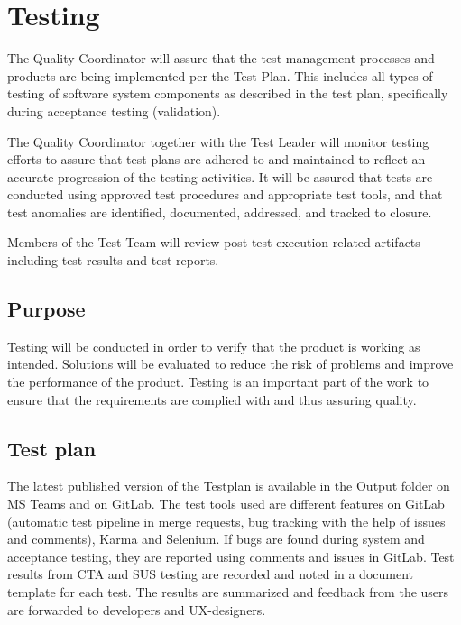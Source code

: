 \section{Testing}

The Quality Coordinator will assure that the test management processes and products are being implemented per the Test Plan. This includes all types of testing of software system components as described in the test plan, specifically during acceptance testing (validation).

The Quality Coordinator together with the Test Leader will monitor testing efforts to assure that test plans are adhered to and maintained to reflect an accurate progression of the testing activities. It will be assured that tests are conducted using approved test procedures and appropriate test tools, and that test anomalies are identified, documented, addressed, and tracked to closure.

Members of the Test Team will review post-test execution related artifacts including test results and test reports.

\subsection{Purpose}
Testing will be conducted in order to verify that the product is working as intended. Solutions will be evaluated to reduce the risk of problems and improve the performance of the product. Testing is an important part of the work to ensure that the requirements are complied with and thus assuring quality.

\subsection{Test plan}
The latest published version of the Testplan is available in the Output folder on MS Teams and on \href{https://gitlab.liu.se/tddc88-company-1-2021/deploy/-/tree/develop/documents/Test\%20Plan}{GitLab}. The test tools used are different features on GitLab (automatic test pipeline in merge requests, bug tracking with the help of issues and comments), Karma and Selenium. If bugs are found during system and acceptance testing, they are reported using comments and issues in GitLab. Test results from CTA and SUS testing are recorded and noted in a document template for each test. The results are summarized and feedback from the users are forwarded to developers and UX-designers.  


